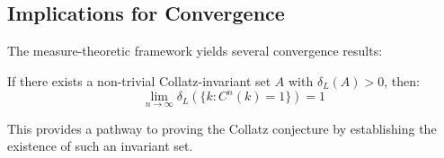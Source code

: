 \subsection{Implications for Convergence}

The measure-theoretic framework yields several convergence results:

\begin{theorem}
If there exists a non-trivial Collatz-invariant set $A$ with $\delta_L(A) > 0$, then:
\[
\lim_{n \to \infty} \delta_L(\{k : C^n(k) = 1\}) = 1
\]
\end{theorem}

This provides a pathway to proving the Collatz conjecture by establishing the existence of such an invariant set. 